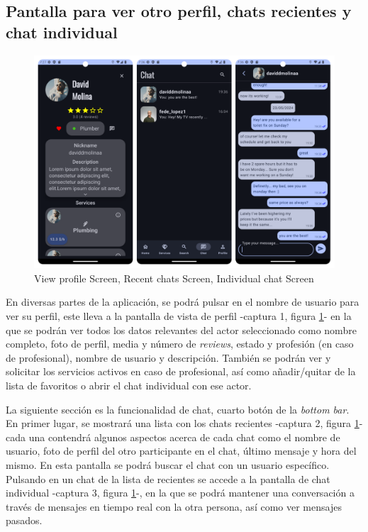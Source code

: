 \subsection{Pantalla para ver otro perfil, chats recientes y chat individual}
\begin{figure}[h]
	\centering
	\includegraphics[width = 1\textwidth]{Imagenes/capturasApp/seeProfile_recent_chat.png}
	\caption{View profile Screen, Recent chats Screen, Individual chat Screen}
	\label{fig:capApp4}
\end{figure}

En diversas partes de la aplicación, se podrá pulsar en el  nombre de usuario para ver su perfil, este lleva a la pantalla de  vista de perfil -captura 1, figura \ref{fig:capApp4}- en la que se podrán ver todos los datos relevantes del actor seleccionado como nombre completo, foto de perfil, media y número de \textit{reviews}, estado y profesión (en caso de profesional), nombre de usuario y descripción. También se podrán ver y solicitar los servicios activos en caso de profesional, así como añadir/quitar de la lista de favoritos o abrir el chat individual con ese actor. 

La siguiente sección es la funcionalidad de chat, cuarto botón de la \textit{bottom bar}. En primer lugar, se mostrará una lista con los chats recientes -captura 2, figura \ref{fig:capApp4}- cada una contendrá algunos aspectos acerca de cada chat como el nombre de usuario, foto de perfil del otro participante en el chat, último mensaje y hora del mismo. En esta pantalla se podrá buscar el chat con un usuario específico. Pulsando en un chat de la lista de recientes se accede a la pantalla de chat individual -captura 3, figura \ref{fig:capApp4}-, en la que se podrá mantener una conversación a través de mensajes en tiempo real con la otra persona, así como ver mensajes pasados.
\newpage
